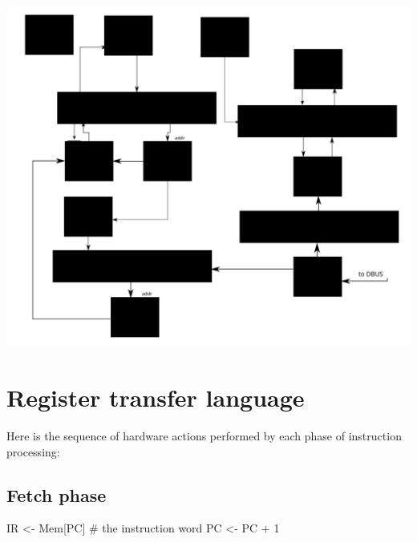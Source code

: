 \documentclass[12pt]{article}
\begin{document}
\includegraphics[width=\textwidth]{controlpath}

\section{Register transfer language}
Here is the sequence of hardware actions performed by each phase of instruction processing:

\subsection{Fetch phase}
\begin{verbatimtab}
IR <- Mem[PC] # the instruction word
PC <- PC + 1
\end{verbatimtab}
\end{document}
